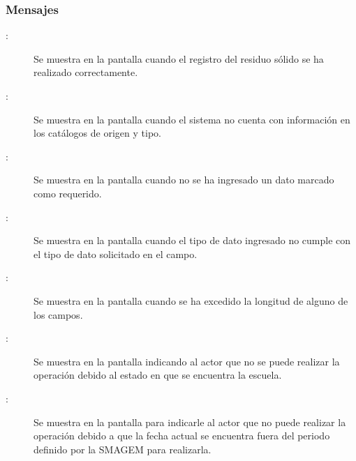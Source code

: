 \subsubsection{Mensajes}

    \begin{description}
      
	    \item [:] Se muestra en la pantalla  cuando el registro del residuo sólido se ha realizado correctamente.	    
	    
	    \item [:] Se muestra en la pantalla  cuando el sistema no cuenta con información en los catálogos de origen y tipo.
	    
	    \item [:] Se muestra en la pantalla  cuando no se ha ingresado un dato marcado como requerido.
	    
	     \item [:] Se muestra en la pantalla  cuando el tipo de dato ingresado no cumple con el tipo de dato solicitado en el campo.
	    
	    \item [:] Se muestra en la pantalla  cuando se ha excedido la longitud de alguno de los campos.
	    
	    \item [:] Se muestra en la pantalla  indicando al actor que no se puede realizar la operación debido al estado en que se encuentra la escuela.
	
	\item [:] Se muestra en la pantalla  para indicarle al actor que no puede realizar la operación debido a que la fecha actual se encuentra fuera del periodo definido por la SMAGEM para realizarla.
	    
	    
    \end{description}
